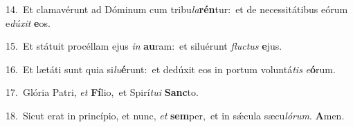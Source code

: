 {\numbfont\textcolor{\numbcolor}{14.}}~Et clamavérunt ad Dóminum cum tribu\-\textit{la}\-\textbf{rén}tur:~\star et de necessitátibus eórum e\-\textit{dú}\-\textit{xit} \textbf{e}\-os.\par
{\numbfont\textcolor{\numbcolor}{15.}}~Et státuit procéllam ejus \textit{in} \textbf{au}\-ram:~\star et siluérunt \textit{fluc}\-\textit{tus} \textbf{e}\-jus.\par
{\numbfont\textcolor{\numbcolor}{16.}}~Et lætáti sunt quia si\-\textit{lu}\-\textbf{é}runt:~\star et dedúxit eos in portum voluntá\textit{tis} \textit{e}\-\textbf{ó}rum.\par
{\numbfont\textcolor{\numbcolor}{17.}}~Glória Patri, \textit{et} \textbf{Fí}\-lio,~\star et Spirí\-\textit{tu}\-\textit{i} \textbf{Sanc}\-to.\par
{\numbfont\textcolor{\numbcolor}{18.}}~Sicut erat in princípio, et nunc, \textit{et} \textbf{sem}\-per,~\star et in sǽcula sæcu\-\textit{ló}\-\textit{rum}. \textbf{A}\-men.\par
